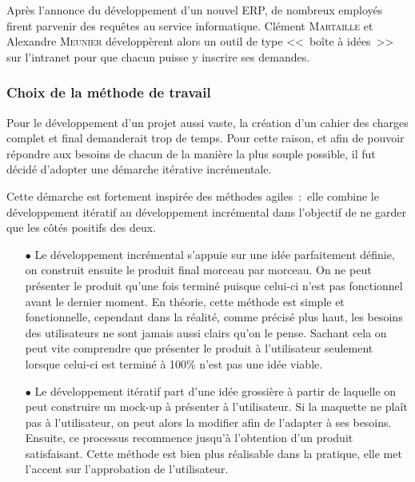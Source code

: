 Après l'annonce du développement d'un nouvel ERP, de nombreux employés firent parvenir des requêtes au service informatique.
Clément \textsc{Martaille} et Alexandre \textsc{Meunier} développèrent alors un outil de type <<~boîte à idées~>> sur l'intranet pour que chacun puisse y inscrire ses demandes.

\subsubsection{Choix de la méthode de travail}

Pour le développement d'un projet aussi vaste, la création d'un cahier des charges complet et final demanderait trop de temps.
Pour cette raison, et afin de pouvoir répondre aux besoins de chacun de la manière la plus souple possible, il fut décidé d'adopter une démarche itérative incrémentale.

Cette démarche est fortement inspirée des méthodes agiles~:~elle combine le développement itératif au développement incrémental dans l'objectif de ne garder que les côtés positifs des deux.
\\
\begin{itemize}
    \item[\tiny$\bullet$] Le développement incrémental s'appuie sur une idée parfaitement définie, on construit ensuite le produit final morceau par morceau.
    On ne peut présenter le produit qu'une fois terminé puisque celui-ci n'est pas fonctionnel avant le dernier moment.
    En théorie, cette méthode est simple et fonctionnelle, cependant dans la réalité, comme précisé plus haut, les besoins des utilisateurs ne sont jamais aussi clairs qu'on le pense.
    Sachant cela on peut vite comprendre que présenter le produit à l'utilisateur seulement lorsque celui-ci est terminé à 100\% n'est pas une idée viable.
    
    \item[\tiny$\bullet$] Le développement itératif part d'une idée grossière à partir de laquelle on peut construire un mock-up à présenter à l'utilisateur.
    Si la maquette ne plaît pas à l'utilisateur, on peut alors la modifier afin de l'adapter à ses besoins.
    Ensuite, ce processus recommence jusqu'à l'obtention d'un produit satisfaisant.
    Cette méthode est bien plus réalisable dans la pratique, elle met l'accent sur l'approbation de l'utilisateur.
    
\end{itemize}
~\\

